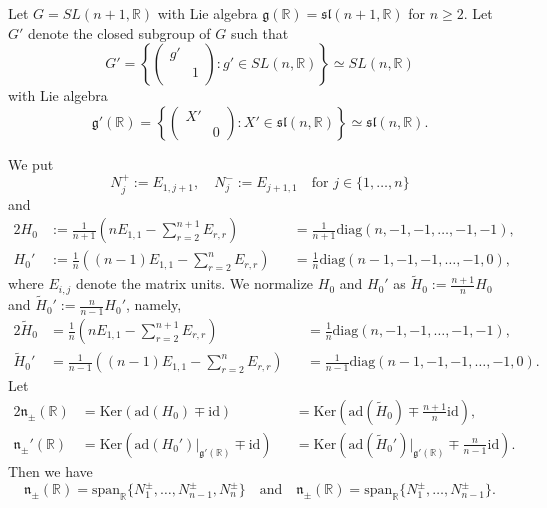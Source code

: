 \documentclass[reqno,11pt]{amsart}
\theoremstyle{remark}
\theoremstyle{definition}
\numberwithin{equation}{section}
\newcommand{\fg}{{\mathfrak g}}
\newcommand{\fn}{{\mathfrak n}}
\newcommand{\f}{\mathfrak}
\newcommand{\R}{\mathbb{R}}
\newcommand{\ad}{\mathrm{ad}}
\newcommand{\spn}{\text{span}}
\newcommand{\wH}{\widetilde{H}}
\newcommand{\diag}{\mathrm{diag}}
\newcommand{\id}{\mathrm{id}}
\newcommand{\Ker}{\mathrm{Ker}}
\begin{document}
Let $G = SL(n+1,\R)$ with Lie algebra $\fg(\R)=\f{sl}(n+1,\R)$ for $n\geq 2$.
Let $G'$ denote the closed subgroup of $G$ such that
\begin{equation*}
G'=
\left\{
\begin{pmatrix}
g'&\\
& 1\\
\end{pmatrix}
:
g' \in SL(n,\R)
\right\}\simeq SL(n,\R)
\end{equation*}
with Lie algebra
\begin{equation}\label{eqn:g'}
\fg'(\R)= \left\{
\begin{pmatrix}
X' & \\
 & 0
\end{pmatrix}
:
X' \in \f{sl}(n,\R)
\right\}\simeq \f{sl}(n,\R).
\end{equation}

We put
\begin{equation*}
N_j^+:=E_{1,j+1},
\quad
N_j^-:=E_{j+1,1}
\quad
\text{for $j\in \{1,\ldots, n\}$}
\end{equation*}
and 
\begin{alignat}{2}
H_0&:=\frac{1}{n+1}(nE_{1,1} - \sum^{n+1}_{r=2}E_{r,r})
&&=\frac{1}{n+1}\diag(n, -1, -1, \ldots, -1,-1),\label{eqn:H0}\\
H_0'&:=\frac{1}{n}((n-1)E_{1,1} - \sum^n_{r=2}E_{r,r})
&&=\frac{1}{n}\diag(n-1, -1, -1, \ldots, -1,0),\label{eqn:H0'}
\end{alignat}
where $E_{i,j}$ denote the matrix units. We normalize $H_0$ and $H_0'$ as
$\wH_0:=\frac{n+1}{n}H_0$ and $\wH_0':=\frac{n}{n-1}H_0'$,
namely,
\begin{alignat}{2}
\wH_0&=\frac{1}{n}(nE_{1,1} - \sum^{n+1}_{r=2}E_{r,r})
&&=\frac{1}{n}\diag(n, -1, -1, \ldots, -1,-1),\label{eqn:0801a}\\
\wH_0'&=\frac{1}{n-1}((n-1)E_{1,1} - \sum^n_{r=2}E_{r,r})
&&=\frac{1}{n-1}\diag(n-1, -1, -1, \ldots, -1,0).\label{eqn:0801b}
\end{alignat}
Let
\begin{alignat}{2}\label{eqn:nR}
\fn_{\pm}(\R) &=\Ker(\ad(H_0)\mp\id) 
&&= \Ker(\ad(\wH_0)\mp\tfrac{n+1}{n}\id),\\
\fn_{\pm}'(\R)&=\Ker(\ad(H_0')\vert_{\fg'(\R)}\mp\id) 
&&=\Ker(\ad(\wH_0')\vert_{\fg'(\R)}\mp\tfrac{n}{n-1}\id).\nonumber
\end{alignat}
Then we have
\begin{equation*}\label{eqn:nR2}
\fn_{\pm}(\R)=\spn_{\R}\{N_1^{\pm},\ldots, N_{n-1}^{\pm}, N_{n}^{\pm} \}
\quad
\text{and}
\quad
\fn_{\pm}(\R)=\spn_{\R}\{N_1^{\pm},\ldots, N_{n-1}^{\pm} \}.
\end{equation*}
\end{document}
